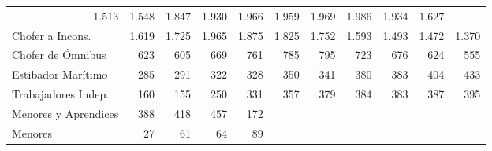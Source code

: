 \begin{tabular}{lllllllllll}
  \multicolumn{1}{|r}{1.513} &
  \multicolumn{1}{r}{1.548} &
  \multicolumn{1}{r}{1.847} &
  \multicolumn{1}{r}{1.930} &
  \multicolumn{1}{r}{1.966} &
  \multicolumn{1}{r}{1.959} &
  \multicolumn{1}{r}{1.969} &
  \multicolumn{1}{r}{1.986} &
  \multicolumn{1}{r}{1.934} &
  \multicolumn{1}{r}{1.627} \\
\multicolumn{1}{l}{\hspace{1em}Chofer a Incons.} &
  \multicolumn{1}{|r}{1.619} &
  \multicolumn{1}{r}{1.725} &
  \multicolumn{1}{r}{1.965} &
  \multicolumn{1}{r}{1.875} &
  \multicolumn{1}{r}{1.825} &
  \multicolumn{1}{r}{1.752} &
  \multicolumn{1}{r}{1.593} &
  \multicolumn{1}{r}{1.493} &
  \multicolumn{1}{r}{1.472} &
  \multicolumn{1}{r}{1.370} \\
\multicolumn{1}{l}{\hspace{1em}Chofer de Ómnibus} &
  \multicolumn{1}{|r}{623} &
  \multicolumn{1}{r}{605} &
  \multicolumn{1}{r}{669} &
  \multicolumn{1}{r}{761} &
  \multicolumn{1}{r}{785} &
  \multicolumn{1}{r}{795} &
  \multicolumn{1}{r}{723} &
  \multicolumn{1}{r}{676} &
  \multicolumn{1}{r}{624} &
  \multicolumn{1}{r}{555} \\
\multicolumn{1}{l}{\hspace{1em}Estibador Marítimo} &
  \multicolumn{1}{|r}{285} &
  \multicolumn{1}{r}{291} &
  \multicolumn{1}{r}{322} &
  \multicolumn{1}{r}{328} &
  \multicolumn{1}{r}{350} &
  \multicolumn{1}{r}{341} &
  \multicolumn{1}{r}{380} &
  \multicolumn{1}{r}{383} &
  \multicolumn{1}{r}{404} &
  \multicolumn{1}{r}{433} \\
\multicolumn{1}{l}{\hspace{1em}Trabajadores Indep.} &
  \multicolumn{1}{|r}{160} &
  \multicolumn{1}{r}{155} &
  \multicolumn{1}{r}{250} &
  \multicolumn{1}{r}{331} &
  \multicolumn{1}{r}{357} &
  \multicolumn{1}{r}{379} &
  \multicolumn{1}{r}{384} &
  \multicolumn{1}{r}{383} &
  \multicolumn{1}{r}{387} &
  \multicolumn{1}{r}{395} \\
\multicolumn{1}{l}{\hspace{1em}Menores y Aprendices} &
  \multicolumn{1}{|r}{388} &
  \multicolumn{1}{r}{418} &
  \multicolumn{1}{r}{457} &
  \multicolumn{1}{r}{172} &
  \multicolumn{1}{r}{} &
  \multicolumn{1}{r}{} &
  \multicolumn{1}{r}{} &
  \multicolumn{1}{r}{} &
  \multicolumn{1}{r}{} &
  \multicolumn{1}{r}{} \\
\multicolumn{1}{l}{\hspace{1em}Menores} &
  \multicolumn{1}{|r}{27} &
  \multicolumn{1}{r}{61} &
  \multicolumn{1}{r}{64} &
  \multicolumn{1}{r}{89} &

\end{tabular}
